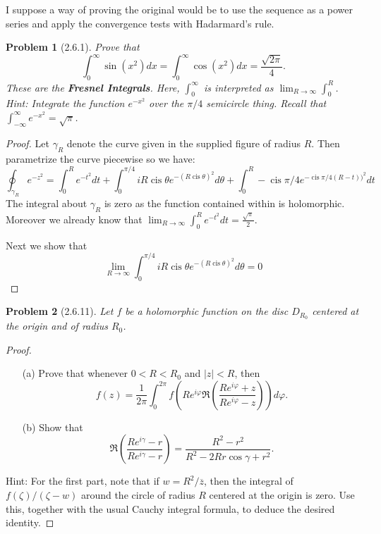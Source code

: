 \documentclass[10pt]{article}
\newcommand{\sk}{\vskip 10mm}
\newcommand{\conj}[1]{\overline{#1}}
\DeclareMathOperator{\cis}{cis}
\theoremstyle{plain}
\newtheorem{problem}{Problem}
\theoremstyle{remark}
\begin{document}
I suppose a way of proving the original would be to use the sequence
as a power series and apply the convergence tests with Hadarmard's rule.

\sk

\begin{problem}[2.6.1]
  Prove that
  \[
    \int_0^\infty\sin(x^2)dx=\int_0^\infty\cos(x^2)dx=\frac{\sqrt{2\pi}}{4}.
  \]
  These are the \textbf{Fresnel Integrals}. Here, $\int_0^\infty$ is
  interpreted as $\lim_{R\rightarrow\infty}\int_0^R$.\\
  Hint: Integrate the function $e^{-x^2}$ over the $\pi/4$ semicircle
  thing. Recall that $\int_{-\infty}^\infty e^{-x^2}=\sqrt{\pi}$.
\end{problem}

\begin{proof}
  Let $\gamma_R$ denote the curve given in the supplied figure of radius $R$.
  Then parametrize the curve piecewise so we have:
  \[
    \oint_{\gamma_R}e^{-z^2} = \int_0^Re^{-t^2}dt+\int_0^{\pi/4}iR\cis\theta e^{-(R\cis\theta)^2}d\theta +\int_0^R-\cis\pi/4e^{-\cis\pi/4(R-t))^2 } dt
  \]
  The integral about $\gamma_R$ is zero as the function contained within is holomorphic.
  Moreover we already know that $\lim_{R\rightarrow\infty}\int_0^Re^{-t^2}dt=\frac{\sqrt{\pi}}{2}$.

  Next we show that
  \[
    \lim_{R\rightarrow\infty}\int_0^{\pi/4}iR\cis\theta e^{-(R\cis\theta)^2}d\theta=0
  \]
\end{proof}

\sk

\begin{problem}[2.6.11]
  Let $f$ be a holomorphic function on the disc $D_{R_0}$ centered at the
  origin and of radius $R_0$.
\end{problem}

\begin{proof}
  \begin{itemize}
  \item[(a)] Prove that whenever $0<R<R_0$ and $|z|<R$, then
    \[
      f(z)=\frac{1}{2\pi}\int_0^{2\pi}f(Re^{i\varphi}\Re\left(\frac{Re^{i\varphi}+z}{Re^{i\varphi}-z}\right))d\varphi.
    \]
  \item[(b)] Show that
    \[
      \Re\left(\frac{Re^{i\gamma}-r}{Re^{i\gamma}-r}\right) = \frac{R^2-r^2}{R^2-2Rr\cos\gamma + r^2}.
    \]
  \end{itemize}
  Hint: For the first part, note that if $w=R^2/\conj{z}$, then the integral of
  $f(\zeta)/(\zeta-w)$ around the circle of radius $R$ centered at the origin is
  zero. Use this, together with the usual Cauchy integral formula, to deduce
  the desired identity.
\end{proof}

\end{document}
